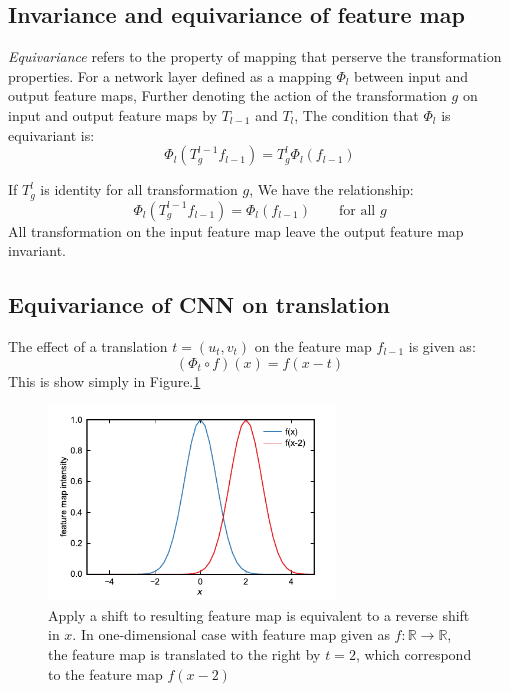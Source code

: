 \documentclass{IEEEtran}
\begin{document}
\subsection*{Invariance and equivariance of feature map}
\emph{Equivariance} refers to the property of mapping that perserve the transformation properties. 
For a network layer defined as a mapping $\Phi_l$ between input and output feature maps,  
Further denoting the action of the transformation $g$ on input and output feature maps by $T_{l-1}$ and $T_l$,
The condition that $\Phi_l$ is equivariant is:
\begin{equation}
    \Phi_l (T^{l-1}_g f_{l-1}) = T^l_g \Phi_l (f_{l-1}) \label{E:equivariant_condition}
\end{equation}

If $T^l_g$ is identity for all transformation $g$, We have the relationship:
\begin{equation}
    \Phi_l (T^{l-1}_g f_{l-1}) = \Phi_l (f_{l-1})\qquad \text{for all $g$} \label{E:invariant_condition}
\end{equation}
All transformation on the input feature map leave the output feature map invariant.

\subsection*{Equivariance of CNN on translation}
The effect of a translation $t = (u_t,v_t)$ on the feature map $f_{l-1}$ is given as:
\begin{equation}
    \label{E:translation_on_featuremap}
    (\Phi_t \circ f) (x) = f(x-t)
\end{equation}
This is show simply in Figure.\ref{F:3dnn_shift}
\begin{figure}[h]
    \centering
    \includegraphics[width=3in]{figures/3dnn_shift.pdf}
    \caption{Apply a shift to resulting feature map is equivalent to a reverse shift in $x$. 
                In one-dimensional case with feature map given as $f\colon \mathbb{R} \to \mathbb{R}$,
                the feature map is translated to the right by $t = 2$, which correspond to the feature map $f(x-2)$}
    \label{F:3dnn_shift}
\end{figure}
\end{document}
